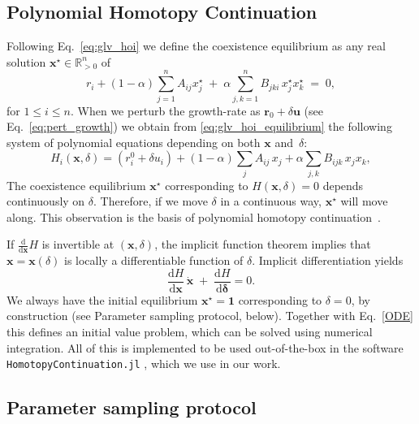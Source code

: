 \documentclass[
 reprint,
 amsmath,
 amssymb,
 aps,
 superscriptaddress,
]{revtex4-2}
\begin{document}
\subsection*{Polynomial Homotopy Continuation}
Following Eq.~\eqref{eq:glv_hoi} we define the coexistence equilibrium as any real solution $\mathbf x^\star \in \mathbb{R}^n_{>0}$ of
\begin{equation}\label{eq:glv_hoi_equilibrium}
r_i + (1-\alpha)\sum_{j=1}^n A_{ij}x^\star_j
\;+\;\alpha\sum_{j,k=1}^n B_{jki}\,x^\star_j x^\star_k \;=\;0,
\end{equation}
for $ 1\leq i\leq n$. When we perturb the growth-rate as $\mathbf r_0+\delta \mathbf u$ (see Eq.~\eqref{eq:pert_growth}) we obtain from \eqref{eq:glv_hoi_equilibrium} the following system of polynomial equations depending on both $\mathbf x$ and~$\delta$:
$$
H_i(\mathbf x,\delta) = (r^0_i + \delta u_i) +(1-\alpha)\sum_{j} A_{ij}\,x_j + \alpha\sum_{j,k} B_{ijk}\,x_jx_k,
$$
The coexistence equilibrium $\mathbf x^\star$ corresponding to $H(\mathbf x, \delta) = 0$ depends continuously on $\delta$. Therefore, if we move $\delta$ in a continuous way, $\mathbf x^\star$  will move along. This observation is the basis of polynomial homotopy continuation~\cite{sommese_numerical_2005}. 


If $\frac{\mathrm d}{\mathrm d \mathbf x} H$ is invertible at $(\mathbf x, \delta)$, the implicit function theorem implies that $\mathbf x = \mathbf x(\delta)$ is locally a differentiable function of $\delta$. Implicit differentiation yields
\begin{equation}\label{ODE}
\frac{\mathrm d H}{\mathrm d \mathbf x}\,  \dot{\mathbf x} \;+\; \frac{\mathrm d H}{\mathrm d \mathbf \delta }=0.
\end{equation}
We always have the initial equilibrium $\mathbf x^\star = \mathbf 1$ corresponding to $\delta = 0$, by construction (see Parameter sampling protocol, below). Together with Eq.~\eqref{ODE} this defines an initial value problem, which can be solved using numerical integration. All of this is implemented to be used out-of-the-box in the software \texttt{HomotopyContinuation.jl} \cite{breiding_homotopycontinuationjl_2018}, which we use in our work.

 \subsection*{Parameter sampling protocol}
\end{document}
